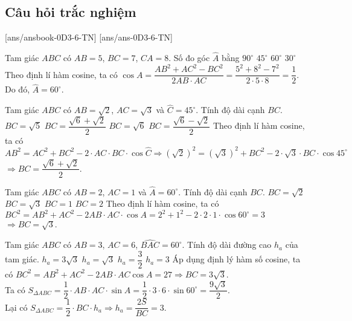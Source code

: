 \subsection{Câu hỏi trắc nghiệm}
	[ans/ansbook-0D3-6-TN]
	[ans/ans-0D3-6-TN]
	\begin{ex}%
		Tam giác $ ABC$ có $ AB=5$, $BC=7$, $CA=8$. Số đo góc $ \widehat{A}$ bằng
		\choice
		{$ 90^\circ $}
		{$ 45^\circ $}
		{\True $ 60^\circ $}
		{$ 30^\circ $}
		\loigiai
		{Theo định lí hàm cosine, ta có $ \cos{A}=\dfrac{AB^2+AC^2-BC^2}{2AB\cdot AC}=\dfrac{5^2+8^2-7^2}{2\cdot 5\cdot 8}=\dfrac{1}{2}$.\\
			Do đó, $ \widehat{A}=60^\circ $.}
	\end{ex}
	\begin{ex}%
		Tam giác $ ABC$ có $ AB=\sqrt{2}$, $AC=\sqrt{3}$ và $ \widehat{C}=45^\circ $. Tính độ dài cạnh $ BC$.
		\choice
		{$ BC=\sqrt{5}$}
		{\True $ BC=\dfrac{\sqrt{6}+\sqrt{2}}{2}$}
		{$ BC=\sqrt{6}$}
		{$ BC=\dfrac{\sqrt{6}-\sqrt{2}}{2}$}
		\loigiai
		{Theo định lí hàm cosine, ta có\\
			$ AB^2=AC^2+BC^2-2\cdot AC\cdot BC\cdot \cos \widehat{C}\Rightarrow {(\sqrt{2} )}^2={(\sqrt{3} )}^2+BC^2-2\cdot \sqrt{3}\cdot BC\cdot \cos 45^\circ $ \\
			$ \Rightarrow BC=\dfrac{\sqrt{6}+\sqrt{2}}{2}$.}
	\end{ex}
	\begin{ex}%
		Tam giác $ ABC$ có $ AB=2$, $AC=1$ và $ \widehat{A}=60^\circ $. Tính độ dài cạnh $ BC$.
		\choice
		{$ BC=\sqrt{2}$}
		{\True $ BC=\sqrt{3}$}
		{$ BC=1$}
		{$ BC=2$}
		\loigiai
		{Theo định lí hàm cosine, ta có\\
			$ BC^2=AB^2+AC^2-2AB\cdot AC\cdot \cos{A}=2^2+1^2-2\cdot 2\cdot 1\cdot \cos 60^\circ =3$\\
			$\Rightarrow BC=\sqrt{3}$.}
	\end{ex}
	\begin{ex}%
		Tam giác $ ABC$ có $ AB=3$, $AC=6$, $\widehat{BAC}=60^\circ $. Tính độ dài đường cao $ h_a$ của tam giác.
		\choice
		{$ h_a=3\sqrt{3}$}
		{$ h_a=\sqrt{3}$}
		{$ h_a=\dfrac{3}{2}$}
		{\True $ h_a=3$}
		\loigiai
		{Áp dụng định lý hàm số cosine, ta có
			$ BC^2=AB^2+AC^2-2AB\cdot AC\cos A=27\Rightarrow BC=3\sqrt{3}$.\\
			Ta có $ S_{\Delta ABC}=\dfrac{1}{2}\cdot AB\cdot AC\cdot \sin{A}=\dfrac{1}{2}\cdot 3\cdot 6\cdot \sin 60^\circ=\dfrac{9\sqrt{3}}{2}$.\\
			Lại có $ S_{\Delta ABC}=\dfrac{1}{2}\cdot BC\cdot h_a\Rightarrow h_a=\dfrac{2S}{BC}=3$.}
	\end{ex}
